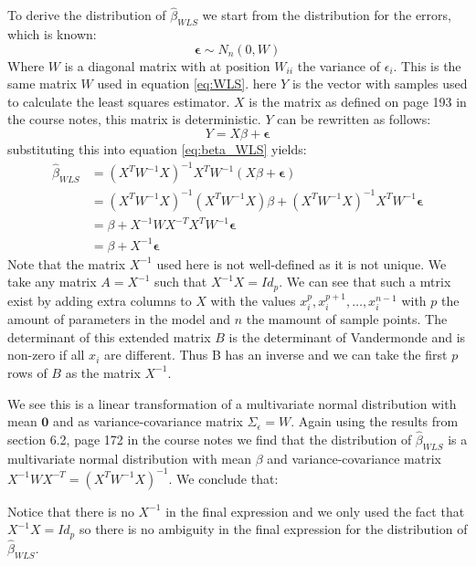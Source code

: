 \documentclass[a4paper]{article}
\begin{document}
To derive the distribution of $\hat{\beta}_{WLS}$ we start from the distribution for the errors, which is known:
\begin{equation*}
	\mathbf{\epsilon} \sim N_n(0, W)
\end{equation*}
Where $W$ is a diagonal matrix with at position $W_{ii}$ the variance of $\epsilon_i$. This is the same matrix $W$ used in equation \ref{eq:WLS}. here $Y$ is the vector with samples used to calculate the least squares estimator. $X$ is the matrix as defined on page 193 in the course notes, this matrix is deterministic. $Y$ can be rewritten as follows:
\begin{equation*}
	Y = X \beta + \mathbf{\epsilon}
\end{equation*}
substituting this into equation \ref{eq:beta_WLS} yields:
\begin{align*}
	\hat{\beta}_{WLS} &= (X^TW^{-1}X)^{-1} X^TW^{-1}(X\beta+\mathbf{\epsilon})\\
			  &= (X^TW^{-1}X)^{-1} (X^TW^{-1}X) \beta + (X^TW^{-1}X)^{-1} X^TW^{-1}\mathbf{\epsilon}\\
			  &= \beta + X^{-1} W X^{-T} X^T W^{-1} \mathbf{\epsilon}\\
			  &= \beta + X^{-1} \mathbf{\epsilon} 
\end{align*}
Note that the matrix $X^{-1}$ used here is not well-defined as it is not unique. We take any matrix $A=X^{-1}$ such that $X^{-1}X=Id_{p}$. We can see that such a mtrix exist by adding extra columns to $X$ with the values $x_i^p, x_i^{p+1}, \ldots, x_i^{n-1}$ with $p$ the amount of parameters in the model and $n$ the mamount of sample points. The determinant of this extended matrix $B$ is the determinant of Vandermonde and is non-zero if all $x_i$ are different. Thus B has an inverse and we can take the first $p$ rows of $B$ as the matrix $X^{-1}$.

We see this is a linear transformation of a multivariate normal distribution with mean $\mathbf{0}$ and as variance-covariance matrix $\Sigma_{\epsilon}=W$. Again using the results from section 6.2, page 172 in the course notes we find that the distribution of $\hat{\beta}_{WLS}$ is a multivariate normal distribution with mean $\beta$ and variance-covariance matrix $X^{-1} W X^{-T} = (X^T W^{-1} X)^{-1}$. We conclude that:


Notice that there is no $X^{-1}$ in the final expression and we only used the fact that $X^{-1}X=Id_p$ so there is no ambiguity in the final expression for the distribution of $\hat{\beta}_{WLS}$.
\end{document}
